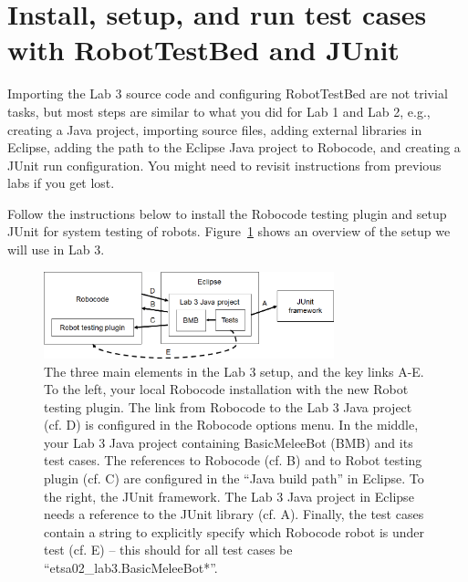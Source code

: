 \documentclass{scrreprt}
\begin{document}
\section{Install, setup, and run test cases with RobotTestBed and JUnit}
Importing the Lab 3 source code and configuring RobotTestBed are not trivial tasks, but most steps are similar to what you did for Lab 1 and Lab 2, e.g., creating a Java project, importing source files, adding external libraries in Eclipse, adding the path to the Eclipse Java project to Robocode, and creating a JUnit run configuration.  You might need to revisit instructions from previous labs if you get lost. 

Follow the instructions below to install the Robocode testing plugin and setup JUnit for system testing of robots. Figure~\ref{fig:overview} shows an overview of the setup we will use in Lab 3.

\begin{figure}
\centering
\includegraphics[width=0.75\textwidth]{figures/overview.png}
\caption{The three main elements in the Lab 3 setup, and the key links A-E. To the left, your local Robocode installation with the new Robot testing plugin. The link from Robocode to the Lab 3 Java project (cf. D) is configured in the Robocode options menu. In the middle, your Lab 3 Java project containing BasicMeleeBot (BMB) and its test cases. The references to Robocode (cf. B) and to Robot testing plugin (cf. C) are configured in the ``Java build path'' in Eclipse. To the right, the JUnit framework. The Lab 3 Java project in Eclipse needs a reference to the JUnit library (cf. A). Finally, the test cases contain a string to explicitly specify which Robocode robot is under test (cf. E) -- this should for all test cases be ``etsa02_lab3.BasicMeleeBot*''.}
\label{fig:overview}
\end{figure}
\end{document}
